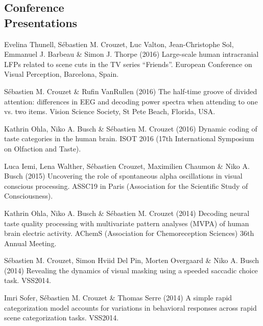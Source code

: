 \documentclass[margin,line]{resume}
\begin{document}
\begin{resume}
	\vspace{3mm}	
    \section{\mysidestyle Conference\\Presentations}

\footnotesize %

Evelina Thunell, Sébastien M. Crouzet, Luc Valton, Jean-Christophe Sol, Emmanuel J. Barbeau \& Simon J. Thorpe (2016) Large-scale human intracranial LFPs related to scene cuts in the TV series “Friends”. European Conference on Visual Perception, Barcelona, Spain.

\vspace{-2mm} Sébastien M. Crouzet \& Rufin VanRullen (2016) The half-time groove of divided attention: differences in EEG and decoding power spectra when attending to one vs. two items. Vision Science Society, St Pete Beach, Florida, USA.

\vspace{-2mm} Kathrin Ohla, Niko A. Busch \& Sébastien M. Crouzet (2016) Dynamic coding of taste categories in the human brain. ISOT 2016 (17th International Symposium on Olfaction and Taste).

\vspace{-2mm} Luca Iemi, Lena Walther, Sébastien Crouzet, Maximilien Chaumon \& Niko A. Busch (2015) Uncovering the role of spontaneous alpha oscillations in visual conscious processing. ASSC19 in Paris (Association for the Scientific Study of Consciousness).
	
\vspace{-2mm} Kathrin Ohla, Niko A. Busch \& Sébastien M. Crouzet (2014) Decoding neural taste quality processing with multivariate pattern analyses (MVPA) of human brain electric activity. AChemS (Association for Chemoreception Sciences) 36th Annual Meeting.

\vspace{-2mm} Sébastien M. Crouzet, Simon Hviid Del Pin, Morten Overgaard \& Niko A. Busch (2014) Revealing the dynamics of visual masking using a speeded saccadic choice task. VSS2014.

\vspace{-2mm} Imri Sofer, Sébastien M. Crouzet \& Thomas Serre (2014) A simple rapid categorization model accounts for variations in behavioral responses across rapid scene categorization tasks. VSS2014.


\end{resume}
\end{document}
